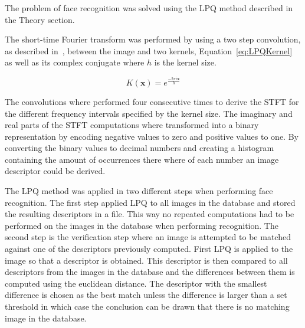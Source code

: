 The problem of face recognition was solved using the LPQ method described in the Theory section.

The short-time Fourier transform was performed by using a two step convolution, as described in~\cite{LPQ:1996}, between the image and two kernels, Equation~\ref{eq:LPQKernel} as well as its complex conjugate where \(h\) is the kernel size.

\begin{equation}
  K(\mathbf{x}) = e^{\frac{-2 \pi i \mathbf{x}}{h}}
\label{eq:LPQKernel}
\end{equation}

The convolutions where performed four consecutive times to derive the STFT
for the different frequency intervals specified by the kernel size. The imaginary and real parts of the STFT computations where transformed into a binary representation by encoding negative values to zero and positive values to one. By converting the binary values to decimal numbers and creating a histogram containing the amount of occurrences there where of each number an image descriptor could be derived.

The LPQ method was applied in two different steps when performing face recognition. The first step applied LPQ to all images in the database and stored the resulting descriptors in a file. This way no repeated computations had to be performed on the images in the database when performing recognition. The second step is the verification step where an image is attempted to be matched against one of the descriptors previously computed. First LPQ is applied to the image so that a descriptor is obtained. This descriptor is then compared to all descriptors from the images in the database and the differences between them is computed using the euclidean distance. The descriptor with the smallest difference is chosen as the best match unless the difference is larger than a set threshold in which case the conclusion can be drawn that there is no matching image in the database.
